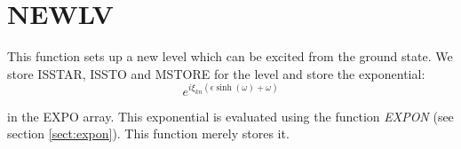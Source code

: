 \section{NEWLV}
\label{sect:newlv}

\noindent This function sets up a new level which can be excited from the
ground state. We store ISSTAR, ISSTO and MSTORE for the level and store the
exponential:\\

\begin{equation}
e^{i \xi_{kn} (\epsilon \sinh(\omega) + \omega)}
\end{equation}

\noindent in the EXPO array. This exponential is evaluated using the
function {\em EXPON} (see section \ref{sect:expon}). This function merely
stores it.\\
